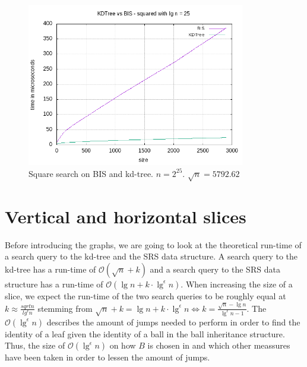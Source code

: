 \begin{figure}[h]
    \centering
    \includegraphics[width = 0.85\textwidth]{pictures/analysis/sqrt_25.png}
    \caption{Square search on BIS and kd-tree. $n=2^{25}$. $\sqrt{n} = 5792.62$}\label{fig:sqrt_25}
\end{figure}
\clearpage


\section{Vertical and horizontal slices}

Before introducing the graphs, we are going to look at the theoretical run-time of a search query to the kd-tree and the SRS data structure. A search query to the kd-tree has a run-time of $\mathcal{O}(\sqrt{n}+k)$ and a search query to the SRS data structure has a run-time of $\mathcal{O}(\lg n + k \cdot \lg^\epsilon n)$. When increasing the size of a slice, we expect the run-time of the two search queries to be roughly equal at $k \approx \frac{sqrt{n}}{lg^\epsilon n}$ stemming from $\sqrt{n} + k = \lg n + k \cdot \lg^\epsilon n \Leftrightarrow k = \frac{\sqrt{n} - \lg n}{\lg^\epsilon n - 1}$. The $\mathcal{O}(\lg^\epsilon n)$ describes the amount of jumps needed to perform in order to find the identity of a leaf given the identity of a ball in the ball inheritance structure. Thus, the size of $\mathcal{O}(\lg^\epsilon n)$ on how $B$ is chosen in  and which other meassures have been taken in order to lessen the amount of jumps. 

